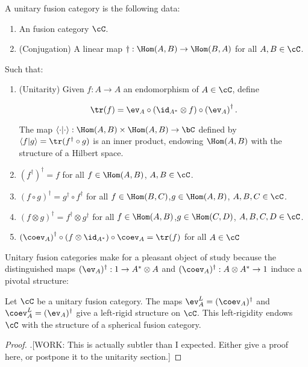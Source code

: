 \begin{defn} A unitary fusion category is the following data:

\begin{enumerate}
\item An fusion category $\cC$.
\item (Conjugation) A linear map $\dagger: \Hom(A,B)\to \Hom(B,A)$ for all $A,B\in \cC$.
\end{enumerate}

Such that:

\begin{enumerate}
\item (Unitarity) Given $f:A\to A$ an endomorphism of $A\in \cC$, define


$$\tr(f)=\ev_A \circ (\id_{A^*}\otimes f)\circ \left(\ev_A\right)^{\dagger}.$$

The map $\left<\cdot|\cdot\right>:\Hom(A,B)\times \Hom(A,B)\to \bC$ defined by $\left<f|g\right>=\tr(f^{\dagger}\circ g)$ is an inner product, endowing $\Hom(A,B)$ with the structure of a Hilbert space.
\item $\left(f^{\dagger}\right)^{\dagger}=f$ for all $f\in \Hom(A,B)$, $A,B\in \cC$.

\item $(f\circ g)^{\dagger}=g^{\dagger}\circ f^{\dagger}$ for all $f\in \Hom(B,C)$,$g\in \Hom(A,B)$, $A,B,C\in \cC$.

\item $(f\otimes g)^{\dagger}=f^{\dagger}\otimes g^{\dagger}$ for all $f\in \Hom(A,B)$,$g\in \Hom(C,D)$, $A,B,C,D\in \cC$.
\item $\left(\coev_A\right)^{\dagger}\circ (f \otimes \id_{A^*})\circ \coev_A=\tr(f)$ for all $A\in \cC$
\end{enumerate}

\raggedleft\qedsymbol{}
\end{defn}

Unitary fusion categories make for a pleasant object of study because the distinguished maps $(\ev_A)^{\dagger}:1\to A^{*}\otimes A$ and $(\coev_A)^{\dagger}:A\otimes A^{*}\to 1$ induce a pivotal structure:

\begin{prop} Let $\cC$ be a unitary fusion category. The maps $\ev_{A}^L = (\coev_{A})^{\dagger}$ and $\coev^L_{A}=(\ev_A)^{\dagger}$ give a left-rigid structure on $\cC$. This left-rigidity endows $\cC$ with the structure of a spherical fusion category.
\end{prop}
\begin{proof}.[WORK: This is actually subtler than I expected. Either give a proof here, or postpone it to the unitarity section.]
\end{proof}

